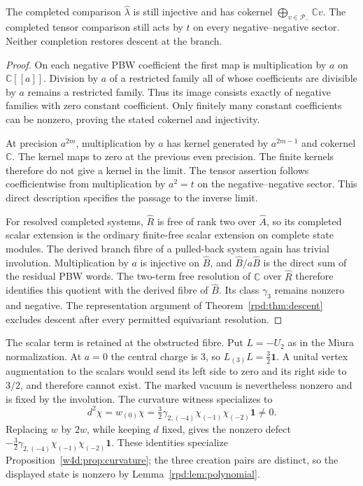 \begin{proposition}\label{rpd:prop:completion}
The completed comparison $\widehat\lambda$ is still injective and has
cokernel $\bigoplus_{v\in\mathcal P_-}\mathbb C v$. The completed
tensor comparison still acts by $t$ on every negative--negative
sector. Neither completion restores descent at the branch.
\end{proposition}
\begin{proof}
On each negative PBW coefficient the first map is multiplication by
$a$ on $\mathbb C[[a]]$. Division by $a$ of a restricted family all
of whose coefficients are divisible by $a$ remains a restricted
family. Thus its image consists exactly of negative families with
zero constant coefficient. Only finitely many constant coefficients
can be nonzero, proving the stated cokernel and injectivity.

At precision $a^{2m}$, multiplication by $a$ has kernel generated by
$a^{2m-1}$ and cokernel $\mathbb C$. The kernel maps to zero at the
previous even precision. The finite kernels therefore do not give a
kernel in the limit. The tensor assertion follows coefficientwise
from multiplication by $a^2=t$ on the negative--negative sector.
This direct description specifies the passage to the inverse limit.

For resolved completed systems, $\widehat R$ is free of rank two
over $\widehat A$, so its completed scalar extension is the ordinary
finite-free scalar extension on complete state modules. The derived
branch fibre of a pulled-back system again has trivial involution.
Multiplication by $a$ is injective on $\widehat B$, and
$\widehat B/a\widehat B$ is the direct sum of the residual PBW words.
The two-term free resolution of $\mathbb C$ over $\widehat R$
therefore identifies this quotient with the derived fibre of
$\widehat B$. Its class $\gamma_3$ remains nonzero and negative.
The representation argument of Theorem~\ref{rpd:thm:descent}
excludes descent after every permitted equivariant resolution.\qedhere
\end{proof}

\begin{example}\label{rpd:ex:scalar}
The scalar term is retained at the obstructed fibre. Put $L=-U_2$
as in the Miura normalization. At $a=0$ the
central charge is $3$, so $L_{(3)}L=\tfrac32\mathbf1$. A unital vertex
augmentation to the scalars would send its left side to zero and its
right side to $3/2$, and therefore cannot exist. The marked vacuum is
nevertheless nonzero and is fixed by the involution. The curvature
witness specializes to
\[
 d^2\chi=w_{(0)}\chi
   =\tfrac32\gamma_{2,(-4)}\chi_{(-1)}\chi_{(-2)}\mathbf1\ne0.
\]
Replacing $w$ by $2w$, while keeping $d$ fixed, gives the nonzero defect
$-\tfrac32\gamma_{2,(-4)}\chi_{(-1)}\chi_{(-2)}\mathbf1$.
These identities specialize Proposition~\ref{w4d:prop:curvature};
the three creation pairs are distinct, so the displayed state is
nonzero by Lemma~\ref{rpd:lem:polynomial}.
\end{example}

